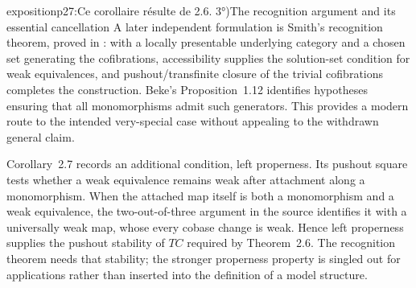 \begin{dcomment}{exposition}{p27:Ce corollaire résulte de 2.6. 3°)}{The recognition argument and its essential cancellation}
A later independent formulation is Smith's recognition theorem, proved in \citet[Theorem~1.7]{Beke2000}: with a locally presentable underlying category and a chosen set generating the cofibrations, accessibility supplies the solution-set condition for weak equivalences, and pushout/transfinite closure of the trivial cofibrations completes the construction. Beke's Proposition~1.12 identifies hypotheses ensuring that all monomorphisms admit such generators. This provides a modern route to the intended very-special case without appealing to the withdrawn general claim.

Corollary~2.7 records an additional condition, left properness. Its pushout square tests whether a weak equivalence remains weak after attachment along a monomorphism. When the attached map itself is both a monomorphism and a weak equivalence, the two-out-of-three argument in the source identifies it with a universally weak map, whose every cobase change is weak. Hence left properness supplies the pushout stability of $TC$ required by Theorem~2.6. The recognition theorem needs that stability; the stronger properness property is singled out for applications rather than inserted into the definition of a model structure.
\end{dcomment}

